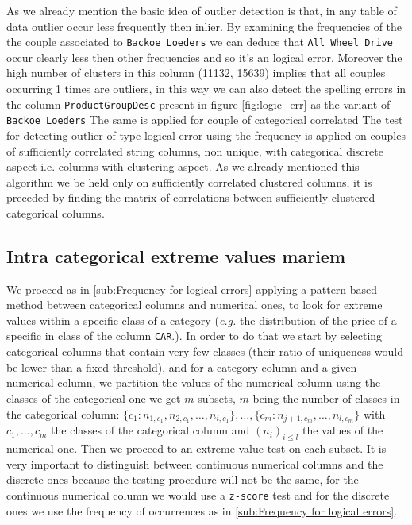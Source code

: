 \documentclass{article}
\begin{document}
As we already mention the basic idea of outlier detection is that, in any table of data outlier occur less frequently then inlier.
By examining the frequencies of the the couple associated to \texttt{Backoe Loeders} we can deduce that \texttt{All Wheel Drive} occur clearly less then other frequencies and so it's an logical error. Moreover the high number of clusters in this column (11132, 15639) implies that all couples occurring 1 times are outliers, in this way we can also detect the spelling errors in the column \texttt{ProductGroupDesc} present in figure \ref{fig:logic_err} as the variant of \texttt{Backoe Loeders}
The same is applied for couple of categorical correlated
The test for detecting outlier of type logical error using the frequency is applied on couples of sufficiently correlated string columns, non unique, with categorical discrete aspect i.e. columns with clustering aspect.
As we already mentioned this algorithm we be held only on sufficiently correlated clustered columns, it is preceded by finding the matrix of correlations between sufficiently clustered  categorical columns.

\subsection{Intra categorical extreme values mariem} %
\label{sub:Intra categorical extreme values}
We proceed as in \ref{sub:Frequency for logical errors} applying a pattern-based method between categorical columns and numerical ones, to look for extreme values within a specific class of a category (\textit{e.g.} the distribution of the price of a specific in class of the column \texttt{CAR}.). In order to do that we start by selecting categorical columns that contain very few classes (their ratio of uniqueness would be lower than a fixed threshold), and for a category column and a given numerical column, we partition the values of the numerical column using the classes of the categorical one we get $m$ subsets, $m$ being the number of classes in the categorical column: $\{c_1: n_{1, c_1}, n_{2, c_1}, \ldots, n_{i, c_1}\}, \ldots, \{c_m: n_{j+1, c_m}, \ldots,  n_{l, c_m}\}$ with $c_1, \ldots, c_m$ the classes of the categorical column and $(n_i)_{i \leq l}$ the values of the numerical one. Then we proceed to an extreme value test on each subset.
It is very important to distinguish between continuous numerical columns and the discrete ones because the testing procedure will not be the same, for the continuous numerical column we would use a \texttt{z-score} test and for the discrete ones we use the frequency of occurrences as in \ref{sub:Frequency for logical errors}.
\end{document}
